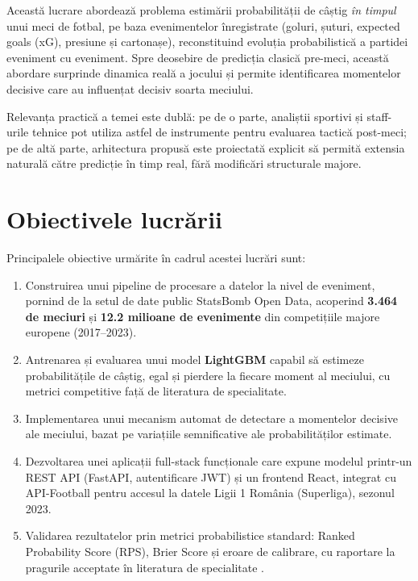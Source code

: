 Această lucrare abordează problema estimării probabilității de câștig
\textit{în timpul} unui meci de fotbal, pe baza evenimentelor înregistrate
(goluri, șuturi, expected goals (xG), presiune și cartonașe),
reconstituind evoluția probabilistică a partidei eveniment cu eveniment.
Spre deosebire de predicția clasică pre-meci, această abordare surprinde
dinamica reală a jocului și permite identificarea momentelor decisive
care au influențat decisiv soarta meciului.

Relevanța practică a temei este dublă: pe de o parte, analiștii sportivi
și staff-urile tehnice pot utiliza astfel de instrumente pentru evaluarea
tactică post-meci; pe de altă parte, arhitectura propusă este proiectată
explicit să permită extensia naturală către predicție în timp real, fără
modificări structurale majore.

\section*{Obiectivele lucrării}

Principalele obiective urmărite în cadrul acestei lucrări sunt:

\begin{enumerate}
    \item Construirea unui pipeline de procesare a datelor la nivel de
    eveniment, pornind de la setul de date public StatsBomb Open Data,
    acoperind \textbf{3.464 de meciuri} și \textbf{12.2 milioane de
    evenimente} din competițiile majore europene (2017--2023).

    \item Antrenarea și evaluarea unui model \textbf{LightGBM} capabil
    să estimeze probabilitățile de câștig, egal și pierdere la fiecare
    moment al meciului, cu metrici competitive față de literatura de
    specialitate.

    \item Implementarea unui mecanism automat de detectare a momentelor
    decisive ale meciului, bazat pe variațiile semnificative ale
    probabilităților estimate.

    \item Dezvoltarea unei aplicații full-stack funcționale care expune
    modelul printr-un REST API (FastAPI, autentificare JWT) și un frontend
    React, integrat cu API-Football pentru accesul la datele Ligii 1
    România (Superliga), sezonul 2023.

    \item Validarea rezultatelor prin metrici probabilistice standard:
    Ranked Probability Score (RPS), Brier Score și eroare de calibrare,
    cu raportare la pragurile acceptate în literatura de specialitate
    \cite{Robberechts2019}.
\end{enumerate}


